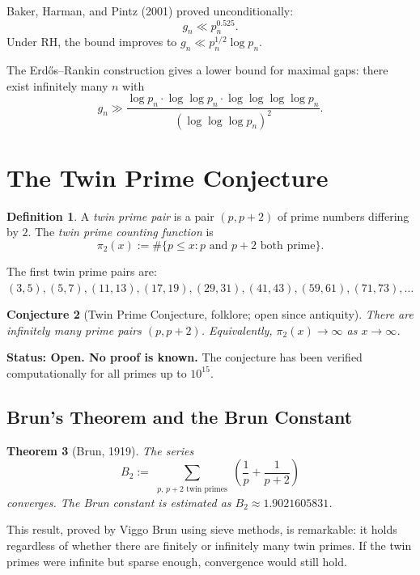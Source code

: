 \documentclass[12pt,a4paper]{amsart}
\newtheorem{theorem}{Theorem}[section]
\newtheorem{conjecture}[theorem]{Conjecture}
\theoremstyle{definition}
\newtheorem{definition}[theorem]{Definition}
\begin{document}
Baker, Harman, and Pintz (2001) proved unconditionally:
\[
  g_n \ll p_n^{0.525}.
\]
Under RH, the bound improves to $g_n \ll p_n^{1/2} \log p_n$.

The Erd\H{o}s--Rankin construction gives a lower bound for maximal gaps:
there exist infinitely many $n$ with
\[
  g_n \gg \frac{\log p_n \cdot \log\log p_n \cdot \log\log\log\log p_n}{(\log\log\log p_n)^2}.
\]

\section{The Twin Prime Conjecture}

\begin{definition}
A \emph{twin prime pair} is a pair $(p, p+2)$ of prime numbers differing by $2$.
The \emph{twin prime counting function} is
\[
  \pi_2(x) := \#\{p \leq x : p \text{ and } p+2 \text{ both prime}\}.
\]
\end{definition}

The first twin prime pairs are: $(3,5), (5,7), (11,13), (17,19), (29,31),
(41,43), (59,61), (71,73), \ldots$

\begin{conjecture}[Twin Prime Conjecture, folklore; open since antiquity]
There are infinitely many prime pairs $(p, p+2)$. Equivalently,
$\pi_2(x) \to \infty$ as $x \to \infty$.
\end{conjecture}

\textbf{Status: Open. No proof is known.} The conjecture has been verified
computationally for all primes up to $10^{15}$.

\subsection{Brun's Theorem and the Brun Constant}

\begin{theorem}[Brun, 1919]
The series
\[
  B_2 := \sum_{\substack{p,\, p+2 \text{ twin primes}}} \left(\frac{1}{p} + \frac{1}{p+2}\right)
\]
converges. The \emph{Brun constant} is estimated as $B_2 \approx 1.9021605831$.
\end{theorem}

This result, proved by Viggo Brun using sieve methods, is remarkable: it holds
regardless of whether there are finitely or infinitely many twin primes. If the
twin primes were infinite but sparse enough, convergence would still hold.
\end{document}
